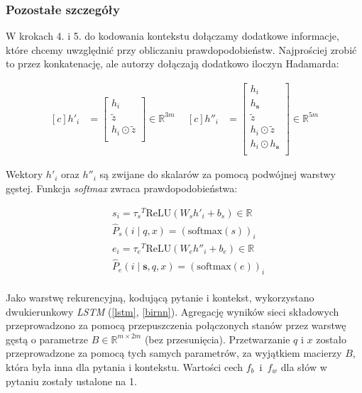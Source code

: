 
\subsubsection{Pozostałe szczegóły}

W krokach 4. i 5. do kodowania kontekstu dołączamy dodatkowe informacje, które chcemy uwzględnić przy obliczaniu prawdopodobieństw. Najprościej zrobić to przez konkatenację, ale autorzy dołączają dodatkowo iloczyn Hadamarda:

\[
\begin{aligned}[c]
    h'_i &=
    \begin{bmatrix}
        h_i \\
        \tilde{z} \\
        h_i \odot \tilde{z} \\
    \end{bmatrix} \in \mathbb{R}^{3m}
\end{aligned} \ \
\begin{aligned}[c]
    h''_i &=
    \begin{bmatrix}
        h_i \\
        h_{\mathbf{s}} \\
        \tilde{z} \\
        h_i \odot \tilde{z} \\
        h_i \odot h_{\mathbf{s}} \\
    \end{bmatrix} \in \mathbb{R}^{5m}
\end{aligned}
\]


Wektory $h'_i$ oraz $h''_i$ są zwijane do skalarów za pomocą podwójnej warstwy gęstej. Funkcja \textit{softmax} zwraca prawdopodobieństwa:

\[
\begin{aligned}
    &s_i = {\tau_s}^T \mathrm{ReLU}(W_s h'_i + b_s) \in \mathbb{R}\\
    &\hat{P}_s(i \mid q, x) = (\mathrm{softmax}(s))_i \\[10pt]
    &e_i = {\tau_e}^T \mathrm{ReLU}(W_e h''_i + b_e) \in \mathbb{R}\\
    &\hat{P}_e(i \mid \mathbf{s}, q, x) = (\mathrm{softmax}(e))_i\\[5pt]
\end{aligned}
\]

Jako warstwę rekurencyjną, kodującą pytanie i kontekst, wykorzystano dwukierunkowy \textit{LSTM} (\ref{lstm}, \ref{birnn}). Agregację wyników sieci składowych przeprowadzono za pomocą przepuszczenia połączonych stanów przez warstwę gęstą o parametrze $B \in \mathbb{R}^{m \times 2m}$ (bez przesunięcia). Przetwarzanie $q$ i $x$ zostało przeprowadzone za pomocą tych samych parametrów, za wyjątkiem macierzy $B$, która była inna dla pytania i kontekstu. Wartości cech $f_b$~i~$f_w$ dla słów w pytaniu zostały ustalone na 1.

